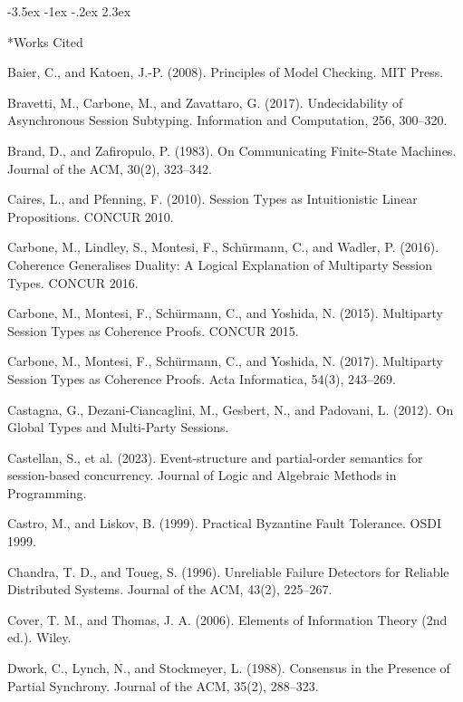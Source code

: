 \documentclass[a4paper,10pt,twocolumn,english]{article}
\makeatletter
\renewcommand{\section}{\@startsection{section}{1}{\z@}%
  {-3.5ex \@plus -1ex \@minus -.2ex}%
  {2.3ex}%
  {\raggedright\normalfont\large\bfseries}}
\numberwithin{equation}{section}
\theoremstyle{paperdef}
\theoremstyle{paperplain}
\theoremstyle{paperdef}
\theoremstyle{paperremark}
\newenvironment{citelist}{%
  \begin{list}{}{%
    \setlength{\leftmargin}{1.25em}%
    \setlength{\itemindent}{-1.25em}%
    \setlength{\itemsep}{2pt}%
    \setlength{\parsep}{0pt}%
    \setlength{\topsep}{3pt}}%
}{\end{list}}
\makeatother
\begin{document}
\section*{Works Cited}

\begin{citelist}
	\item Baier, C., and Katoen, J.-P. (2008). Principles of Model Checking. MIT Press.
	\item Bravetti, M., Carbone, M., and Zavattaro, G. (2017). Undecidability of Asynchronous Session Subtyping. Information and Computation, 256, 300--320.
	\item Brand, D., and Zafiropulo, P. (1983). On Communicating Finite-State Machines. Journal of the ACM, 30(2), 323--342.
	\item Caires, L., and Pfenning, F. (2010). Session Types as Intuitionistic Linear Propositions. CONCUR 2010.
	\item Carbone, M., Lindley, S., Montesi, F., Sch\"urmann, C., and Wadler, P. (2016). Coherence Generalises Duality: A Logical Explanation of Multiparty Session Types. CONCUR 2016.
	\item Carbone, M., Montesi, F., Sch\"urmann, C., and Yoshida, N. (2015). Multiparty Session Types as Coherence Proofs. CONCUR 2015.
	\item Carbone, M., Montesi, F., Sch\"urmann, C., and Yoshida, N. (2017). Multiparty Session Types as Coherence Proofs. Acta Informatica, 54(3), 243--269.
	\item Castagna, G., Dezani-Ciancaglini, M., Gesbert, N., and Padovani, L. (2012). On Global Types and Multi-Party Sessions.
	\item Castellan, S., et al. (2023). Event-structure and partial-order semantics for session-based concurrency. Journal of Logic and Algebraic Methods in Programming.
	\item Castro, M., and Liskov, B. (1999). Practical Byzantine Fault Tolerance. OSDI 1999.
	\item Chandra, T. D., and Toueg, S. (1996). Unreliable Failure Detectors for Reliable Distributed Systems. Journal of the ACM, 43(2), 225--267.
	\item Cover, T. M., and Thomas, J. A. (2006). Elements of Information Theory (2nd ed.). Wiley.
	\item Dwork, C., Lynch, N., and Stockmeyer, L. (1988). Consensus in the Presence of Partial Synchrony. Journal of the ACM, 35(2), 288--323.

\end{citelist}
\end{document}
